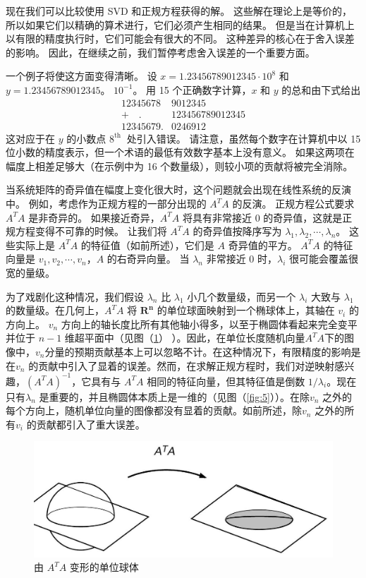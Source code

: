 \documentclass[11pt,a4paper,twoside]{article}
\begin{document}
\begin{CJK}{UTF8}{gbsn}
现在我们可以比较使用 SVD 和正规方程获得的解。 这些解在理论上是等价的，所以如果它们以精确的算术进行，它们必须产生相同的结果。 但是当在计算机上以有限的精度执行时，它们可能会有很大的不同。 这种差异的核心在于舍入误差的影响。 因此，在继续之前，我们暂停考虑舍入误差的一个重要方面。

一个例子将使这方面变得清晰。 设 $x=1.23456789012345 \cdot 10^{8}$ 和 $y=1.23456789012345$。 $10^{-1}$。 用 15 个正确数字计算，$x$ 和 $y$ 的总和由下式给出
$$
\begin{array}{rll}
12345678 & 9012345 \\
+\quad . & 123456789012345 \\
\hline 12345679 . & 0246912
\end{array}
$$
这对应于在 $y$ 的小数点 $8^{\text {th }}$ 处引入错误。 请注意，虽然每个数字在计算机中以 15 位小数的精度表示，但一个术语的最低有效数字基本上没有意义。 如果这两项在幅度上相差足够大（在示例中为 16 个数量级），则较小项的贡献将被完全消除。

当系统矩阵的奇异值在幅度上变化很大时，这个问题就会出现在线性系统的反演中。 例如，考虑作为正规方程的一部分出现的 $A^{T} A$ 的反演。 正规方程公式要求 $A^{T} A$ 是非奇异的。 如果接近奇异，$A^{T} A$ 将具有非常接近 0 的奇异值，这就是正规方程变得不可靠的时候。 让我们将 $A^{T} A$ 的奇异值按降序写为 $\lambda_{1}, \lambda_{2}, \cdots, \lambda_{n}$。 这些实际上是 $A^{T} A$ 的特征值（如前所述），它们是 $A$ 奇异值的平方。 $A^{T} A$ 的特征向量是 $v_{1}, v_{2}, \cdots, v_{n}$，$A$ 的右奇异向量。 当 $\lambda_{n}$ 非常接近 0 时，$\lambda_{i}$ 很可能会覆盖很宽的量级。

为了戏剧化这种情况，我们假设 $\lambda_{n}$ 比 $\lambda_{1}$ 小几个数量级，而另一个 $\lambda_{i}$ 大致与 $\lambda_{ 1}$ 的数量级。在几何上，$A^{T} A$ 将 $\mathbf{R}^{\mathbf{n}}$ 的单位球面映射到一个椭球体上，其轴在 $v_{i}$ 的方向上。 $v_{n}$ 方向上的轴长度比所有其他轴小得多，以至于椭圆体看起来完全变平并位于 $n-1$ 维超平面中（见图（\ref{fig:4}） ）。因此，在单位长度随机向量$A^{T}A$下的图像中，$v_{n}$分量的预期贡献基本上可以忽略不计。在这种情况下，有限精度的影响是在$v_{n}$ 的贡献中引入了显着的误差。然而，在求解正规方程时，我们对逆映射感兴趣，$\left(A^{T} A\right)^{-1}$，它具有与 $A^{T} A$ 相同的特征向量，但其特征值是倒数 $1 / \lambda_{i}$。现在只有$\lambda_{n}$ 是重要的，并且椭圆体本质上是一维的（见图（\ref{fig:5}））。在除$v_{n}$ 之外的每个方向上，随机单位向量的图像都没有显着的贡献。如前所述，除$v_{n}$ 之外的所有$v_{i}$ 的贡献都引入了重大误差。

\begin{figure}[htbp]%
  \centering
  \includegraphics[totalheight=2in]{./fig/4.jpg}
  \caption{由 $A^{T} A$ 变形的单位球体} 
  \label{fig:4}
\end{figure}


\end{CJK}
\end{document}

